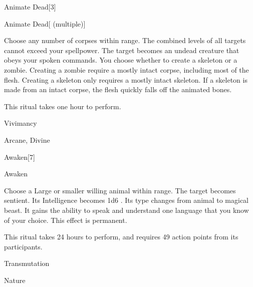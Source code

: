 
\begin{spellsection}{Animate Dead}[3]

\begin{spellheader}
\end{spellheader}


\begin{ability}{Animate Dead}[ (multiple)]

Choose any number of corpses within \rngclose range.
The combined levels of all targets cannot exceed your spellpower.
The target becomes an undead creature that obeys your spoken commands.
You choose whether to create a skeleton or a zombie.
Creating a zombie require a mostly intact corpse, including most of the flesh.
Creating a skeleton only requires a mostly intact skeleton.
If a skeleton is made from an intact corpse, the flesh quickly falls off the animated bones.

This ritual takes one hour to perform.

\end{ability}




 Vivimancy

 Arcane, Divine
\end{spellsection}


\begin{spellsection}{Awaken}[7]


\begin{ability}{Awaken}

Choose a Large or smaller willing animal within \rngclose range.
The target becomes sentient.
Its Intelligence becomes 1d6 .
Its type changes from animal to magical beast.
It gains the ability to speak and understand one language that you know of your choice.
This effect is permanent.

This ritual takes 24 hours to perform, and requires 49 action points from its participants.

\end{ability}




 Transmutation

 Nature
\end{spellsection}


